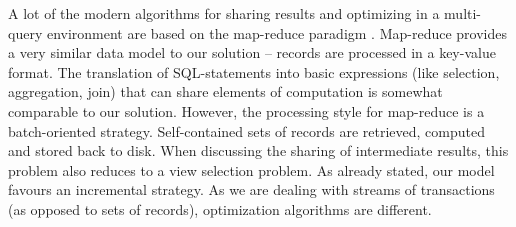 A lot of the modern algorithms for sharing results and optimizing in a 
multi-query environment are based on the map-reduce paradigm 
\cite{map_reduce1, map_reduce2, map_reduce3, map_reduce4}. Map-reduce 
provides a very similar data model to our solution -- records are 
processed in a key-value format. The translation of SQL-statements into 
basic expressions (like selection, aggregation, join) that can share 
elements of computation \cite{map_reduce3} is somewhat comparable to our 
solution. However, the processing style for map-reduce is a 
batch-oriented strategy. Self-contained sets of records are retrieved, 
computed and stored back to disk. When discussing the sharing of 
intermediate results, this problem also reduces to a view selection 
problem. As already stated, our model favours an incremental strategy.
As we are dealing with streams of transactions (as opposed to sets of 
records), optimization algorithms are different. 



